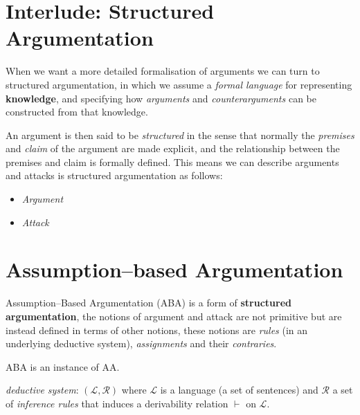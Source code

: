 \section{Interlude: Structured Argumentation}


When we want a more detailed formalisation of arguments we can turn to structured argumentation, 
in which we assume a \textit{formal language} for representing \textbf{knowledge}, 
and specifying how \textit{arguments} and \textit{counterarguments} can be constructed from that knowledge.



An argument is then said to be \textit{structured} in the sense that normally the \textit{premises} and \textit{claim} of the argument are made explicit, 
and the relationship between the premises and claim is formally defined.
% 
This means we can describe arguments and attacks is structured argumentation as follows:
\begin{itemize}[itemsep=5pt,parsep=5pt,leftmargin=3em,topsep=5pt]
    \item 
    \textit{Argument}

    \item 
    \textit{Attack}
\end{itemize}









\clearpage
\section{Assumption--based Argumentation}


Assumption--Based Argumentation (ABA) is a form of \textbf{structured argumentation}, 
the notions of argument and attack are not primitive but are instead defined in terms of other notions, 
these notions are  
\textit{rules} (in an underlying deductive system), 
\textit{assignments} and their \textit{contraries}.


ABA is an instance of AA.



\vspace{1.5em}

\textit{deductive system}: 
$(\mathcal{L},\mathcal{R})$ where $\mathcal{L}$ is a language (a set of sentences) and $\mathcal{R}$ a set of \textit{inference rules} that induces a derivability relation $\vdash$ on $\mathcal{L}$.



